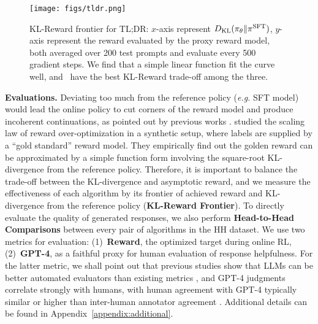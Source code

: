 \documentclass{article} %
\newcommand{\algn}{\text{P3O}}
\begin{document}
\begin{wrapfigure}{r}{0.5\textwidth}
  \vspace*{-0.7cm}
  \hspace{-10pt}
    \texttt{[image: figs/tldr.png]}\vspace{-0.02\textwidth}
    \caption{KL-Reward frontier for TL;DR: $x$-axis represent $D_{\mathrm{KL}}(\pi_{\theta}\|\pi^{\text{SFT}})$, $y$-axis represent the reward evaluated by the proxy reward model, both averaged over 200 test prompts and evaluate every 500 gradient steps. We find that a simple linear function fit the curve well, and \algn\ have the best KL-Reward trade-off among the three.}
  \vspace*{-0.4cm}
    \label{figure:tldr}
\end{wrapfigure}

\textbf{Evaluations.}\label{metric:klreward} Deviating too much from the reference policy (\textit{e.g.} SFT model) would lead the online policy to cut corners of the reward model and produce incoherent continuations, as pointed out by previous works \citep{ziegler2019fine}.
\citet{gao2023scaling} studied the scaling law of reward over-optimization in a synthetic setup, where labels are supplied by a ``gold standard'' reward model. They empirically find out the golden reward can be approximated by a simple function form involving the square-root KL-divergence from the reference policy.
Therefore, it is important to balance the trade-off between the KL-divergence and asymptotic reward, and we measure the effectiveness of each algorithm by its frontier of achieved reward and KL-divergence from the reference policy (\textbf{KL-Reward Frontier}). To directly evaluate the quality of generated responses, we also perform \textbf{Head-to-Head Comparisons} between every pair of algorithms in the HH dataset. We use two metrics for evaluation: (1)~\textbf{Reward}, the optimized target during online RL, (2)~\textbf{GPT-4}, as a faithful proxy for human evaluation of response helpfulness. For the latter metric, we shall point out that previous studies show that LLMs can be better automated evaluators than existing metrics \citep{chen2023exploring}, and GPT-4 judgments correlate strongly with humans, with human agreement with GPT-4 typically similar or higher than inter-human annotator agreement \citep{rafailov2023direct}. Additional details can be found in Appendix~\ref{appendix:additional}.
\end{document}
